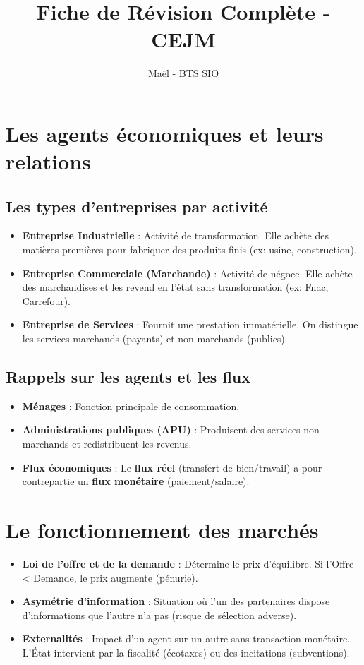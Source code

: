 \documentclass[11pt,a4paper]{article}
\title{Fiche de Révision Complète - CEJM}
\author{Maël - BTS SIO}
\date{}
\begin{document}
\maketitle

\section{Les agents économiques et leurs relations}
\subsection{Les types d'entreprises par activité}
\begin{itemize}[label=$\bullet$]
    \item \textbf{Entreprise Industrielle} : Activité de transformation. Elle achète des matières premières pour fabriquer des produits finis (ex: usine, construction).
    \item \textbf{Entreprise Commerciale (Marchande)} : Activité de négoce. Elle achète des marchandises et les revend en l'état sans transformation (ex: Fnac, Carrefour).
    \item \textbf{Entreprise de Services} : Fournit une prestation immatérielle. On distingue les services marchands (payants) et non marchands (publics).
\end{itemize}

\subsection{Rappels sur les agents et les flux}
\begin{itemize}[label=$\bullet$]
    \item \textbf{Ménages} : Fonction principale de consommation.
    \item \textbf{Administrations publiques (APU)} : Produisent des services non marchands et redistribuent les revenus.
    \item \textbf{Flux économiques} : Le \textbf{flux réel} (transfert de bien/travail) a pour contrepartie un \textbf{flux monétaire} (paiement/salaire).
\end{itemize}

\section{Le fonctionnement des marchés}
\begin{itemize}[label=$\bullet$]
    \item \textbf{Loi de l'offre et de la demande} : Détermine le prix d'équilibre. Si l'Offre < Demande, le prix augmente (pénurie).
    \item \textbf{Asymétrie d'information} : Situation où l'un des partenaires dispose d'informations que l'autre n'a pas (risque de sélection adverse).
    \item \textbf{Externalités} : Impact d'un agent sur un autre sans transaction monétaire. L'État intervient par la fiscalité (écotaxes) ou des incitations (subventions).
\end{itemize}
\end{document}
